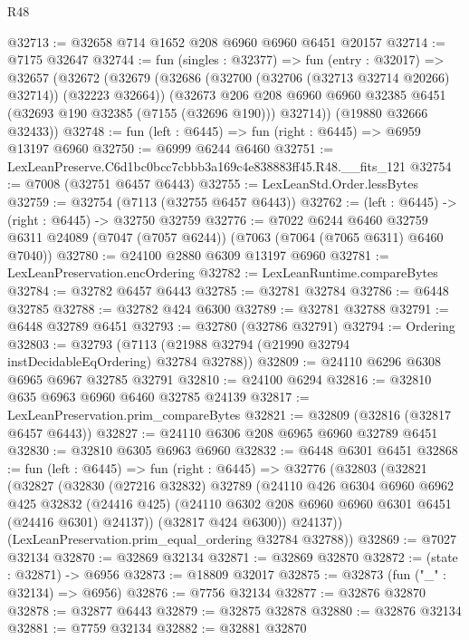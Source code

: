 \begin{lexlean}{R48}
\begin{coremodule}
@32713 := @32658 @714 @1652 @208 @6960 @6960 @6451 @20157
@32714 := @7175 @32647
@32744 := fun (singles : @32377) =>
  fun (entry : @32017) =>
  @32657
    (@32672
      (@32679
        (@32686 (@32700 (@32706 (@32713 @32714 @20266) @32714)) (@32223 @32664))
        (@32673
          @206
          @208
          @6960
          @6960
          @32385
          @6451
          (@32693 @190 @32385 (@7155 (@32696 @190)))
          @32714))
      (@19880 @32666 @32433))
@32748 := fun (left : @6445) => fun (right : @6445) => @6959 @13197 @6960
@32750 := @6999 @6244 @6460
@32751 := LexLeanPreserve.C6d1bc0bcc7cbbb3a169c4e838883ff45.R48.__fits_121
@32754 := @7008 (@32751 @6457 @6443)
@32755 := LexLeanStd.Order.lessBytes
@32759 := @32754 (@7113 (@32755 @6457 @6443))
@32762 := (left : @6445) -> (right : @6445) -> @32750 @32759
@32776 := @7022
    @6244
    @6460
    @32759
    @6311
    @24089
    (@7047 (@7057 @6244))
    (@7063 (@7064 (@7065 @6311) @6460 @7040))
@32780 := @24100 @2880 @6309 @13197 @6960
@32781 := LexLeanPreservation.encOrdering
@32782 := LexLeanRuntime.compareBytes
@32784 := @32782 @6457 @6443
@32785 := @32781 @32784
@32786 := @6448 @32785
@32788 := @32782 @424 @6300
@32789 := @32781 @32788
@32791 := @6448 @32789 @6451
@32793 := @32780 (@32786 @32791)
@32794 := Ordering
@32803 := @32793 (@7113 (@21988 @32794 (@21990 @32794 instDecidableEqOrdering) @32784 @32788))
@32809 := @24110 @6296 @6308 @6965 @6967 @32785 @32791
@32810 := @24100 @6294
@32816 := @32810 @635 @6963 @6960 @6460 @32785 @24139
@32817 := LexLeanPreservation.prim_compareBytes
@32821 := @32809 (@32816 (@32817 @6457 @6443))
@32827 := @24110 @6306 @208 @6965 @6960 @32789 @6451
@32830 := @32810 @6305 @6963 @6960
@32832 := @6448 @6301 @6451
@32868 := fun (left : @6445) =>
  fun (right : @6445) =>
  @32776
    (@32803
      (@32821
        (@32827
          (@32830
            (@27216 @32832)
            @32789
            (@24110
              @426
              @6304
              @6960
              @6962
              @425
              @32832
              (@24416 @425)
              (@24110 @6302 @208 @6960 @6960 @6301 @6451 (@24416 @6301) @24137))
            (@32817 @424 @6300))
          @24137))
      (LexLeanPreservation.prim_equal_ordering @32784 @32788))
@32869 := @7027 @32134
@32870 := @32869 @32134
@32871 := @32869 @32870
@32872 := (state : @32871) -> @6956
@32873 := @18809 @32017
@32875 := @32873 (fun ("_" : @32134) => @6956)
@32876 := @7756 @32134
@32877 := @32876 @32870
@32878 := @32877 @6443
@32879 := @32875 @32878
@32880 := @32876 @32134
@32881 := @7759 @32134
@32882 := @32881 @32870

\end{coremodule}
\end{lexlean}
